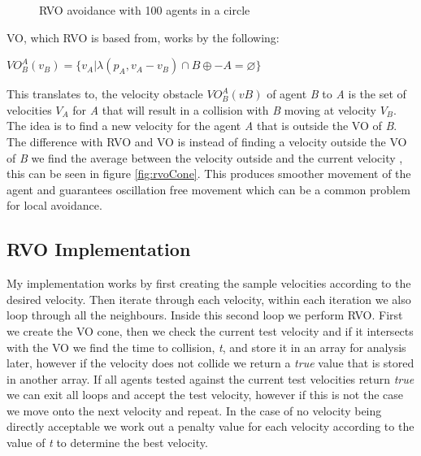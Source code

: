 \documentclass[a4paper,twocolumn]{article}
\begin{document}
\begin{center}
\begin{figure}[t]
\caption{RVO avoidance with 100 agents in a circle}
\label{fig:RVOcircle}
\end{figure}
\end{center}


VO, which RVO is based from, works by the following:\\
\begin{center}
$VO^{A}_{B} (v_{B} ) = \{v_{A} | λ(p_{A} , v_{A} − v_{B} ) \cap B \oplus − A = \varnothing \}$
\end{center}
This translates to, the velocity obstacle $VO^{A}_{B} (v B )$ of agent \emph{B} to \emph{A} is the set of velocities $V_{A}$ for \emph{A} that will result in a collision with \emph{B} moving at velocity $V_{B}$. The idea is to find a new velocity for the agent \emph{A} that is outside the VO of \emph{B}. The difference with RVO and VO is instead of finding a velocity outside the VO of \emph{B} we find the average between the velocity outside and the current velocity \cite{JBerg2008RVO}\cite{AGuy2009CP}, this can be seen in figure \ref{fig:rvoCone}. This produces smoother movement of the agent and guarantees oscillation free movement which can be a common problem for local avoidance.\\


\subsection{RVO Implementation}
My implementation works by first creating the sample velocities according to the desired velocity. Then iterate through each velocity, within each iteration we also loop through all the neighbours. Inside this second loop we perform RVO. First we create the VO cone, then we check the current test velocity and if it intersects with the VO we find the time to collision, \emph{t}, and store it in an array for analysis later, however if the velocity does not collide we return a \emph{true} value that is stored in another array. If all agents tested against the current test velocities return \emph{true} we can exit all loops and accept the test velocity, however if this is not the case we move onto the next velocity and repeat. In the case of no velocity being directly acceptable we work out a penalty value for each velocity according to the value of \emph{t} to determine the best velocity\cite{DCherry2013RVO}\cite{JBerg2008CS}.\\
\end{document}

